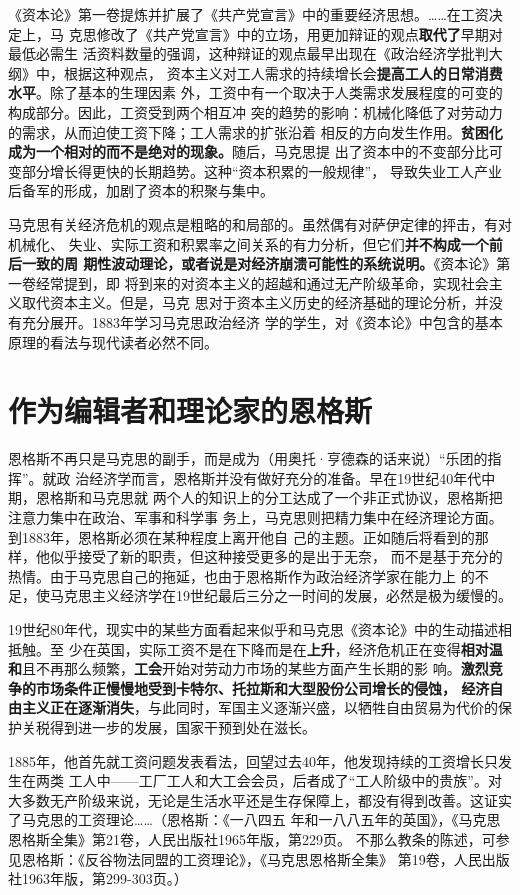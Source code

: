 《资本论》第一卷提炼并扩展了《共产党宣言》中的重要经济思想。……在工资决定上，马
克思修改了《共产党宣言》中的立场，用更加辩证的观点\textbf{取代了}早期对最低必需生
活资料数量的强调，这种辩证的观点最早出现在《政治经济学批判大纲》中，根据这种观点，
资本主义对工人需求的持续增长会\textbf{提高工人的日常消费水平}。除了基本的生理因素
外，工资中有一个取决于人类需求发展程度的可变的构成部分。因此，工资受到两个相互冲
突的趋势的影响：机械化降低了对劳动力的需求，从而迫使工资下降；工人需求的扩张沿着
相反的方向发生作用。\textbf{贫困化成为一个相对的而不是绝对的现象。}随后，马克思提
出了资本中的不变部分比可变部分增长得更快的长期趋势。这种“资本积累的一般规律”，
导致失业工人产业后备军的形成，加剧了资本的积聚与集中。

马克思有关经济危机的观点是粗略的和局部的。虽然偶有对萨伊定律的抨击，有对机械化、
失业、实际工资和积累率之间关系的有力分析，但它们\textbf{并不构成一个前后一致的周
  期性波动理论，或者说是对经济崩溃可能性的系统说明。}《资本论》第一卷经常提到，即
将到来的对资本主义的超越和通过无产阶级革命，实现社会主义取代资本主义。但是，马克
思对于资本主义历史的经济基础的理论分析，并没有充分展开。1883年学习马克思政治经济
学的学生，对《资本论》中包含的基本原理的看法与现代读者必然不同。

\section{作为编辑者和理论家的恩格斯}


恩格斯不再只是马克思的副手，而是成为（用奥托·亨德森的话来说）“乐团的指挥”。就政
治经济学而言，恩格斯并没有做好充分的准备。早在19世纪40年代中期，恩格斯和马克思就
两个人的知识上的分工达成了一个非正式协议，恩格斯把注意力集中在政治、军事和科学事
务上，马克思则把精力集中在经济理论方面。到1883年，恩格斯必须在某种程度上离开他自
己的主题。正如随后将看到的那样，他似乎接受了新的职责，但这种接受更多的是出于无奈，
而不是基于充分的热情。由于马克思自己的拖延，也由于恩格斯作为政治经济学家在能力上
的不足，使马克思主义经济学在19世纪最后三分之一时间的发展，必然是极为缓慢的。

19世纪80年代，现实中的某些方面看起来似乎和马克思《资本论》中的生动描述相抵触。至
少在英国，实际工资不是在下降而是在\textbf{上升}，经济危机正在变得\textbf{相对温
  和}且不再那么频繁，\textbf{工会}开始对劳动力市场的某些方面产生长期的影
响。\textbf{激烈竞争的市场条件正慢慢地受到卡特尔、托拉斯和大型股份公司增长的侵蚀，
  经济自由主义正在逐渐消失}，与此同时，军国主义逐渐兴盛，以牺牲自由贸易为代价的保
护关税得到进一步的发展，国家干预到处在滋长。

1885年，他首先就工资问题发表看法，回望过去40年，他发现持续的工资增长只发生在两类
工人中——工厂工人和大工会会员，后者成了“工人阶级中的贵族”。对大多数无产阶级来说，无论是生活水平还是生存保障上，都没有得到改善。这证实了马克思的工资理论……（恩格斯：《一八四五
年和一八八五年的英国》，《马克思恩格斯全集》第21卷，人民出版社1965年版，第229页。
不那么教条的陈述，可参见恩格斯：《反谷物法同盟的工资理论》，《马克思恩格斯全集》
第19卷，人民出版社1963年版，第299-303页。）

